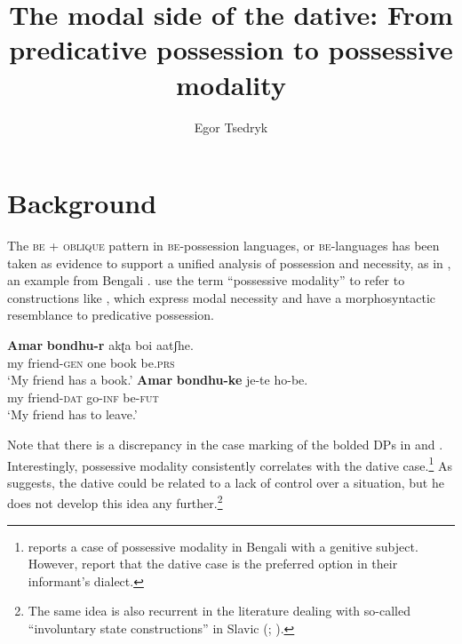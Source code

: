 \documentclass[output=paper,colorlinks,citecolor=brown,modfonts,nonflat]{langsci/langscibook}
\author{Egor Tsedryk\affiliation{Saint Mary’s University}}
\title{The modal side of the dative: From predicative possession to possessive modality}
\begin{document}
\maketitle
{}

\section{Background}\label{sec:tsedryk:1}

The \textsc{be} + \textsc{oblique} pattern in \textsc{be}-possession languages, or \textsc{be}{}-languages \citep{Isačenko1974} has been taken as evidence to support a unified analysis of possession and necessity, as in , an example from Bengali \citep[43]{BjorkmanCowper2016}. \citet[31]{BjorkmanCowper2016} use the term “possessive modality” to refer to constructions like , which express modal necessity and have a morphosyntactic resemblance to predicative possession.

\ea%
    \label{ex:tsedryk:1}
    \ea\label{ex:tsedryk:1a}
    \gll    \textbf{Amar}    \textbf{bondhu-r}     {akʈa}   {boi}     {aatʃhe}.\\
            my       friend-\textsc{gen}  one     book   be.\textsc{prs}\\
    \glt    ‘My friend has a book.’
    \ex\label{ex:tsedryk:1b}
    \gll    \textbf{Amar}    \textbf{bondhu-ke}    {je-te}     {ho-be}.\\
            my friend-\textsc{dat}    go-\textsc{inf}   be-\textsc{fut}\\
    \glt    ‘My friend has to leave.’
    \z
\z


Note that there is a discrepancy in the case marking of the bolded DPs in  and . Interestingly, possessive modality consistently correlates with the dative case.\footnote{\citet[example 7]{Bhatt1997} reports a case of possessive modality in Bengali with a genitive subject. However, \citet[46]{BjorkmanCowper2016} report that the dative case is the preferred option in their informant’s dialect.} As \citet[section 8.1]{Bhatt1997} suggests, the dative could be related to a lack of control over a situation, but he does not develop this idea any further.\footnote{The same idea is also recurrent in the literature dealing with so-called “involuntary state constructions” in Slavic (\citealt[154]{Rivero2009}; \citealt[312]{RiveroArregui2012}).}
\end{document}
